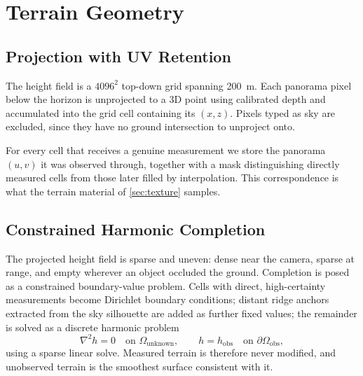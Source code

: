 \section{Terrain Geometry}
\label{sec:terrain}

\subsection{Projection with UV Retention}
\label{sec:uv-retention}

The height field is a $4096^2$ top-down grid spanning \SI{200}{\meter}. Each
panorama pixel below the horizon is unprojected to a 3D point using calibrated
depth and accumulated into the grid cell containing its $(x,z)$. Pixels typed as
sky are excluded, since they have no ground intersection to unproject onto.

For every cell
that receives a genuine measurement we store the panorama $(u,v)$ it was observed
through, together with a mask distinguishing directly measured cells from those
later filled by interpolation. This correspondence is what the terrain material of
\cref{sec:texture} samples.

\subsection{Constrained Harmonic Completion}

The projected height field is sparse and uneven: dense near the camera, sparse at
range, and empty wherever an object occluded the ground. Completion is posed as a
constrained boundary-value problem. Cells with direct, high-certainty measurements
become Dirichlet boundary conditions; distant ridge anchors extracted from the sky
silhouette are added as further fixed values; the remainder is solved as a
discrete harmonic problem
\begin{equation}
  \nabla^2 h = 0 \quad \text{on } \Omega_{\text{unknown}},
  \qquad h = h_{\text{obs}} \quad \text{on } \partial\Omega_{\text{obs}},
\end{equation}
using a sparse linear solve. Measured terrain is therefore never modified, and
unobserved terrain is the smoothest surface consistent with it.

